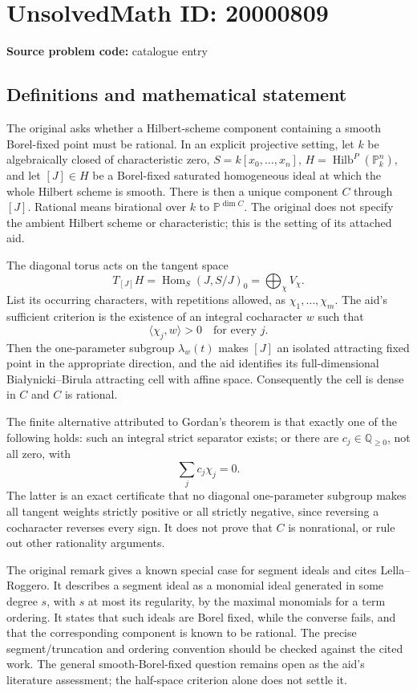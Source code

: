 \documentclass[11pt]{article}
\newcommand{\Q}{\mathbb{Q}}
\newcommand{\PP}{\mathbb{P}}
\begin{document}
\section*{UnsolvedMath ID: 20000809}
\textbf{Source problem code:} catalogue entry
\subsection{Definitions and mathematical statement}
The original asks whether a Hilbert-scheme component containing a smooth Borel-fixed point must be rational. In an explicit projective setting, let $k$ be algebraically closed of characteristic zero, $S=k[x_0,\ldots,x_n]$, $H=\operatorname{Hilb}^{P}(\PP_k^n)$, and let $[J]\in H$ be a Borel-fixed saturated homogeneous ideal at which the whole Hilbert scheme is smooth. There is then a unique component $C$ through $[J]$. Rational means birational over $k$ to $\PP^{\dim C}$. The original does not specify the ambient Hilbert scheme or characteristic; this is the setting of its attached aid.

The diagonal torus acts on the tangent space
\[
T_{[J]}H=\operatorname{Hom}_S(J,S/J)_0=\bigoplus_\chi V_\chi.
\]
List its occurring characters, with repetitions allowed, as $\chi_1,\ldots,\chi_m$. The aid's sufficient criterion is the existence of an integral cocharacter $w$ such that
\[
\langle\chi_j,w\rangle>0\quad\text{for every }j.
\]
Then the one-parameter subgroup $\lambda_w(t)$ makes $[J]$ an isolated attracting fixed point in the appropriate direction, and the aid identifies its full-dimensional Bia\l ynicki--Birula attracting cell with affine space. Consequently the cell is dense in $C$ and $C$ is rational.

The finite alternative attributed to Gordan's theorem is that exactly one of the following holds: such an integral strict separator exists; or there are $c_j\in\Q_{\ge0}$, not all zero, with
\[
\sum_jc_j\chi_j=0.
\]
The latter is an exact certificate that no diagonal one-parameter subgroup makes all tangent weights strictly positive or all strictly negative, since reversing a cocharacter reverses every sign. It does not prove that $C$ is nonrational, or rule out other rationality arguments.

The original remark gives a known special case for segment ideals and cites Lella--Roggero. It describes a segment ideal as a monomial ideal generated in some degree $s$, with $s$ at most its regularity, by the maximal monomials for a term ordering. It states that such ideals are Borel fixed, while the converse fails, and that the corresponding component is known to be rational. The precise segment/truncation and ordering convention should be checked against the cited work. The general smooth-Borel-fixed question remains open as the aid's literature assessment; the half-space criterion alone does not settle it.
\end{document}
